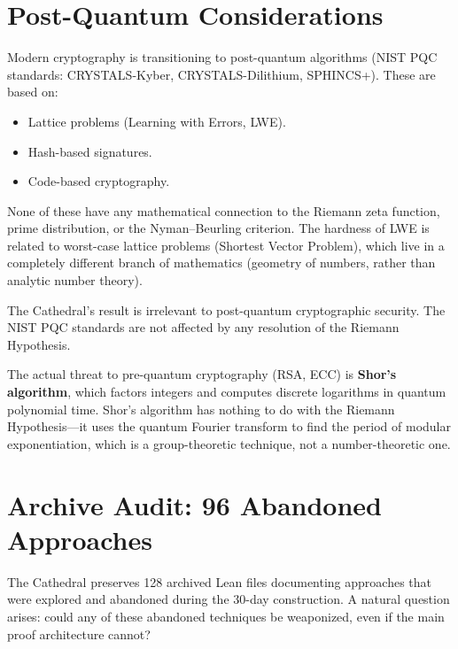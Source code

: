 \documentclass[11pt,a4paper]{article}
\begin{document}
\section{Post-Quantum Considerations}
\label{sec:postquantum}

Modern cryptography is transitioning to post-quantum algorithms
(NIST PQC standards: CRYSTALS-Kyber, CRYSTALS-Dilithium, SPHINCS+).
These are based on:

\begin{itemize}
  \item Lattice problems (Learning with Errors, LWE).
  \item Hash-based signatures.
  \item Code-based cryptography.
\end{itemize}

None of these have any mathematical connection to the Riemann zeta
function, prime distribution, or the Nyman--Beurling criterion. The
hardness of LWE is related to worst-case lattice problems
(Shortest Vector Problem), which live in a completely different
branch of mathematics (geometry of numbers, rather than analytic
number theory).

\begin{claim}
The Cathedral's result is irrelevant to post-quantum cryptographic
security. The NIST PQC standards are not affected by any resolution
of the Riemann Hypothesis.
\end{claim}

The actual threat to pre-quantum cryptography (RSA, ECC) is
\textbf{Shor's algorithm}, which factors integers and computes
discrete logarithms in quantum polynomial time. Shor's algorithm
has nothing to do with the Riemann Hypothesis---it uses the quantum
Fourier transform to find the period of modular exponentiation, which
is a group-theoretic technique, not a number-theoretic one.

\section{Archive Audit: 96 Abandoned Approaches}
\label{sec:archive}

The Cathedral preserves 128 archived Lean files documenting approaches
that were explored and abandoned during the 30-day construction. A
natural question arises: could any of these abandoned techniques
be weaponized, even if the main proof architecture cannot?
\end{document}
